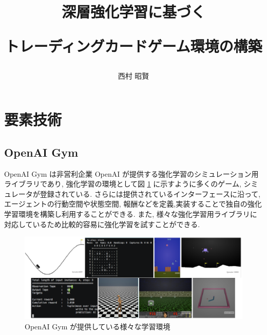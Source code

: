 \documentclass[12pt]{jarticle}
\title{深層強化学習に基づく
\par
トレーディングカードゲーム環境の構築}
\author{西村 昭賢}
\begin{document}
 
\maketitle 
{} 
\tableofcontents
\newpage
%
\listoffigures
\newpage 

 \listoftables
 \newpage



\clearpage

\section{要素技術}

\subsection{OpenAI Gym}
OpenAI Gym \cite{OpenAIGym} は非営利企業 OpenAI が提供する強化学習のシミュレーション用ライブラリであり, 強化学習の環境として図 \ref{fig:OpenAIGymSample} に示すように多くのゲーム, シミュレータが登録されている. さらには提供されているインターフェースに沿って, エージェントの行動空間や状態空間, 報酬などを定義,実装することで独自の強化学習環境を構築し利用することができる. また, 様々な強化学習用ライブラリに対応しているため比較的容易に強化学習を試すことができる.

\begin{figure}[ht]
  \centering
  \includegraphics[width=150mm]{assets/OpenAiGym.eps}
  \vspace{-0.3cm}
  \caption{OpenAI Gym が提供している様々な学習環境}
  \label{fig:OpenAIGymSample}
\end{figure}
\end{document}
